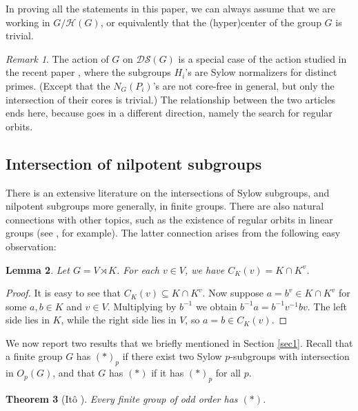 \documentclass[11pt]{amsart}
\numberwithin{equation}{section}
\newtheorem{theorem}{Theorem}[section]
\newtheorem{lemma}[theorem]{Lemma}
\theoremstyle{definition}
\theoremstyle{remark}
\newtheorem{remark}[theorem]{Remark}
\newcommand{\DS}{\mathcal{DS}}
\begin{document}
In proving all the statements in this paper, we can always assume that we are working in $G/\mathcal{H}(G)$,
or equivalently that the (hyper)center of the group $G$ is trivial.

\begin{remark}
The action of $G$ on $\DS(G)$ is a special case of the action studied in the recent paper \cite{AMB24},
where the subgroups $H_i$'s are Sylow normalizers for distinct primes.
(Except that the $N_G(P_i)$'s are not core-free in general, but only the intersection of their cores is trivial.)
The relationship between the two articles ends here, because \cite{AMB24} goes in a different direction,
namely the search for regular orbits.
\end{remark}




\subsection{Intersection of nilpotent subgroups} \label{subSec2.2}

There is an extensive literature on the intersections of Sylow subgroups,
and nilpotent subgroups more generally, in finite groups.
There are also natural connections with other topics, such as the existence of regular orbits in linear groups
(see \cite{Har81}, for example).
 The latter connection arises from the following easy observation:

\begin{lemma} \label{lemIntCen}
Let $G=V \rtimes K$.
For each $v \in V$, we have $C_K(v) =K \cap K^v$.
\end{lemma} 
\begin{proof}
It is easy to see that $C_K(v) \subseteq K \cap K^v$.
Now suppose $a = b^v \in K \cap K^v$ for some $a,b \in K$ and $v \in V$.
Multiplying by $b^{-1}$ we obtain $b^{-1}a = b^{-1} v^{-1} b v$.
The left side lies in $K$, while the right side lies in $V$, so $a=b \in C_K(v)$. 
\end{proof} 

We now report two results that we briefly mentioned in Section \ref{sec1}.
Recall that a finite group $G$ has $(*)_p$
if there exist two Sylow $p$-subgroups with intersection in $O_p(G)$,
and that $G$ has $(*)$ if it has $(*)_p$ for all $p$.

\begin{theorem}[It\^o \cite{Ito58}] \label{thIto}
Every finite group of odd order has $(*)$.
\end{theorem} 
\end{document}
